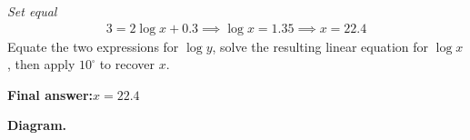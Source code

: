 \documentclass[11pt]{article}
\begin{document}
\textit{Set equal}
\[\begin{gathered}
3 = 2\log x + 0.3 \implies \log x = 1.35 \implies x = 22.4
\end{gathered}\]
Equate the two expressions for \( \log y \), solve the resulting linear equation for \( \log x \), then apply \( 10^{\square} \) to recover \( x \).

\begin{answerbox}
\textbf{Final answer:}\quad \(\displaystyle x = 22.4\)
\end{answerbox}
\textbf{Diagram.}

\begin{center}
\end{center}
\end{document}
